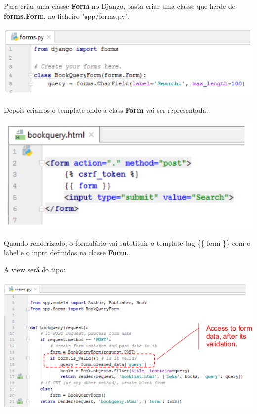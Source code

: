 \documentclass{article}
\begin{document}
\begin{flushleft}
  Para criar uma classe \textbf{Form} no Django, basta criar uma classe que herde de \textbf{forms.Form},
  no ficheiro "app/forms.py".

  \begin{center}
    \includegraphics[scale=0.35]{18}
  \end{center}

  \pagebreak

  Depois criamos o template onde a class \textbf{Form} vai ser representada:

  \begin{center}
    \includegraphics[scale=0.35]{19}
  \end{center}

  Quando renderizado, o formulário vai substituir o template tag \{\{ form \}\}
  com o label e o input definidos na classe \textbf{Form}.

  \vspace{2mm}

  A view será do tipo:

  \begin{center}
    \includegraphics[scale=0.35]{20}
  \end{center}
\end{flushleft}
\end{document}

